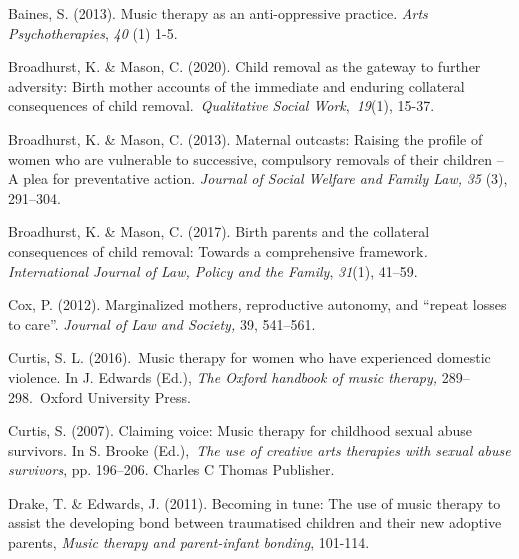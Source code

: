 \documentclass[authordate, empirical]{jote-new-article}
\begin{document}
Baines, S. (2013). Music therapy as an anti-oppressive practice. \emph{Arts Psychotherapies}, \emph{40} (1) 1-5.







Broadhurst, K. \& Mason, C. (2020). Child removal as the gateway to further adversity: Birth mother accounts of the immediate and enduring collateral consequences of child removal. \emph{Qualitative Social Work}, \emph{19}(1), 15-37.







Broadhurst, K. \& Mason, C. (2013). Maternal outcasts: Raising the profile of women who are vulnerable to successive, compulsory removals of their children -- A plea for preventative action. \emph{Journal of Social Welfare and Family Law,} \emph{35 }(3), 291--304.







Broadhurst, K. \& Mason, C. (2017). Birth parents and the collateral consequences of child removal: Towards a comprehensive framework\emph{. International Journal of Law, Policy and the Family},\emph{ 31}(1), 41--59.







Cox, P. (2012). Marginalized mothers, reproductive autonomy, and “repeat losses to care”. \emph{Journal of Law and Society,} 39, 541--561.







Curtis, S. L. (2016). Music therapy for women who have experienced domestic violence. In J. Edwards (Ed.), \emph{The Oxford handbook of music therapy,} 289--298. Oxford University Press.







Curtis, S. (2007). Claiming voice: Music therapy for childhood sexual abuse survivors. In S. Brooke (Ed.), \emph{The use of creative arts therapies with sexual abuse survivors}, pp. 196--206. Charles C Thomas Publisher.







Drake, T. \& Edwards, J. (2011). Becoming in tune: The use of music therapy to assist the developing bond between traumatised children and their new adoptive parents, \emph{Music therapy and parent-infant bonding}, 101-114.
\end{document}
